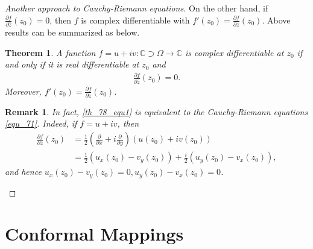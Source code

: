 \documentclass[11pt]{book}
\newtheorem{theorem}{Theorem}[chapter]
\newtheorem{remark}{Remark}[chapter]
\theoremstyle{definition}
\numberwithin{equation}{chapter}
\begin{document}
\begin{proof}[Another approach to Cauchy-Riemann equations]
On the other hand, if $\frac{\partial f}{\partial \overline{z}}(z_0) = 0$, then $f$ is complex differentiable with $f'(z_0) = \frac{\partial f}{\partial z}(z_0)$. Above results can be summarized as below.

\begin{theorem}
A function $f = u + iv: \mathbb{C} \supset \Omega \to \mathbb{C}$ is complex differentiable at $z_0$ if and only if it is real differentiable at $z_0$ and 
\begin{align}\label{th_78_equ1}
    \frac{\partial f}{\partial \overline{z}}(z_0) = 0.
\end{align}
Moreover, $f'(z_0) = \frac{\partial f}{\partial z}(z_0)$.
\end{theorem}

\begin{remark}
In fact, \eqref{th_78_equ1} is equivalent to the Cauchy-Riemann equations \eqref{equ_71}. Indeed, if $f = u + iv$, then 
\begin{align*}
    \frac{\partial f}{\partial \overline{z}}(z_0) & = \frac{1}{2} \left(\frac{\partial}{\partial x} + i \frac{\partial}{\partial y}\right)(u(z_0) + iv(z_0)) \\
    & = \frac{1}{2}\left(u_x(z_0) - v_y(z_0)\right) + \frac{i}{2}\left(u_y(z_0) - v_x(z_0)\right),
\end{align*}
and hence $u_x(z_0) - v_y(z_0) = 0, u_y(z_0) - v_x(z_0) = 0$.  
\end{remark}
\end{proof}

\medskip

\section{Conformal Mappings}
\end{document}
